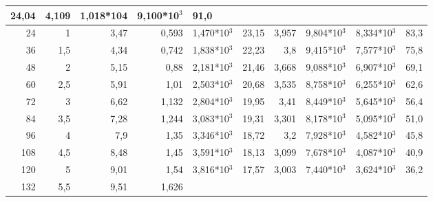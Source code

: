 \begin{table}[H]
{\begin{tabular}{|rr|rrl|rrl|l|r|}
  \multicolumn{1}{r|}{24,04} &
  \multicolumn{1}{r|}{4,109} &
  1,018*104 &
  9,100*10$^3$ &
  91,0 \\ \hline
\multicolumn{1}{|r|}{24} &
  1 &
  \multicolumn{1}{r|}{3,47} &
  \multicolumn{1}{r|}{0,593} &
  1,470*10$^3$ &
  \multicolumn{1}{r|}{23,15} &
  \multicolumn{1}{r|}{3,957} &
  9,804*10$^3$ &
  8,334*10$^3$ &
  83,3 \\ \hline
\multicolumn{1}{|r|}{36} &
  1,5 &
  \multicolumn{1}{r|}{4,34} &
  \multicolumn{1}{r|}{0,742} &
  1,838*10$^3$ &
  \multicolumn{1}{r|}{22,23} &
  \multicolumn{1}{r|}{3,8} &
  9,415*10$^3$ &
  7,577*10$^3$ &
  75,8 \\ \hline
\multicolumn{1}{|r|}{48} &
  2 &
  \multicolumn{1}{r|}{5,15} &
  \multicolumn{1}{r|}{0,88} &
  2,181*10$^3$ &
  \multicolumn{1}{r|}{21,46} &
  \multicolumn{1}{r|}{3,668} &
  9,088*10$^3$ &
  6,907*10$^3$ &
  69,1 \\ \hline
\multicolumn{1}{|r|}{60} &
  2,5 &
  \multicolumn{1}{r|}{5,91} &
  \multicolumn{1}{r|}{1,01} &
  2,503*10$^3$ &
  \multicolumn{1}{r|}{20,68} &
  \multicolumn{1}{r|}{3,535} &
  8,758*10$^3$ &
  6,255*10$^3$ &
  62,6 \\ \hline
\multicolumn{1}{|r|}{72} &
  3 &
  \multicolumn{1}{r|}{6,62} &
  \multicolumn{1}{r|}{1,132} &
  2,804*10$^3$ &
  \multicolumn{1}{r|}{19,95} &
  \multicolumn{1}{r|}{3,41} &
  8,449*10$^3$ &
  5,645*10$^3$ &
  56,4 \\ \hline
\multicolumn{1}{|r|}{84} &
  3,5 &
  \multicolumn{1}{r|}{7,28} &
  \multicolumn{1}{r|}{1,244} &
  3,083*10$^3$ &
  \multicolumn{1}{r|}{19,31} &
  \multicolumn{1}{r|}{3,301} &
  8,178*10$^3$ &
  5,095*10$^3$ &
  51,0 \\ \hline
\multicolumn{1}{|r|}{96} &
  4 &
  \multicolumn{1}{r|}{7,9} &
  \multicolumn{1}{r|}{1,35} &
  3,346*10$^3$ &
  \multicolumn{1}{r|}{18,72} &
  \multicolumn{1}{r|}{3,2} &
  7,928*10$^3$ &
  4,582*10$^3$ &
  45,8 \\ \hline
\multicolumn{1}{|r|}{108} &
  4,5 &
  \multicolumn{1}{r|}{8,48} &
  \multicolumn{1}{r|}{1,45} &
  3,591*10$^3$ &
  \multicolumn{1}{r|}{18,13} &
  \multicolumn{1}{r|}{3,099} &
  7,678*10$^3$ &
  4,087*10$^3$ &
  40,9 \\ \hline
\multicolumn{1}{|r|}{120} &
  5 &
  \multicolumn{1}{r|}{9,01} &
  \multicolumn{1}{r|}{1,54} &
  3,816*10$^3$ &
  \multicolumn{1}{r|}{17,57} &
  \multicolumn{1}{r|}{3,003} &
  7,440*10$^3$ &
  3,624*10$^3$ &
  36,2 \\ \hline
\multicolumn{1}{|r|}{132} &
  5,5 &
  \multicolumn{1}{r|}{9,51} &
  \multicolumn{1}{r|}{1,626} &

\end{tabular}}
\end{table}
